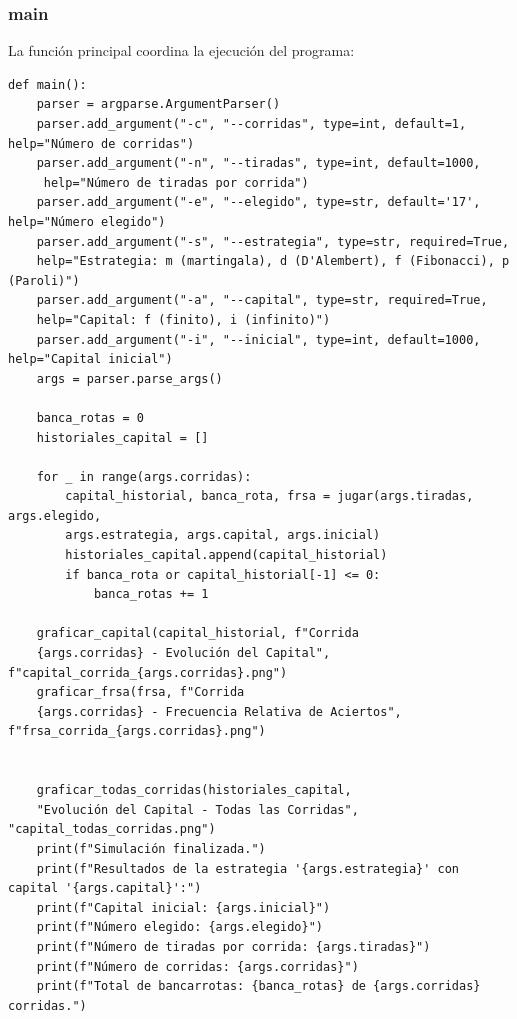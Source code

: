 \documentclass{article}
\begin{document}
\subsubsection{main}
La función principal coordina la ejecución del programa:

\begin{verbatim}
def main():
    parser = argparse.ArgumentParser()
    parser.add_argument("-c", "--corridas", type=int, default=1, help="Número de corridas")
    parser.add_argument("-n", "--tiradas", type=int, default=1000,
     help="Número de tiradas por corrida")
    parser.add_argument("-e", "--elegido", type=str, default='17', help="Número elegido")
    parser.add_argument("-s", "--estrategia", type=str, required=True, 
    help="Estrategia: m (martingala), d (D'Alembert), f (Fibonacci), p (Paroli)")
    parser.add_argument("-a", "--capital", type=str, required=True, 
    help="Capital: f (finito), i (infinito)")
    parser.add_argument("-i", "--inicial", type=int, default=1000, help="Capital inicial")
    args = parser.parse_args()

    banca_rotas = 0
    historiales_capital = []

    for _ in range(args.corridas):
        capital_historial, banca_rota, frsa = jugar(args.tiradas, args.elegido, 
        args.estrategia, args.capital, args.inicial)
        historiales_capital.append(capital_historial)
        if banca_rota or capital_historial[-1] <= 0:
            banca_rotas += 1

    graficar_capital(capital_historial, f"Corrida 
    {args.corridas} - Evolución del Capital", f"capital_corrida_{args.corridas}.png")
    graficar_frsa(frsa, f"Corrida 
    {args.corridas} - Frecuencia Relativa de Aciertos", f"frsa_corrida_{args.corridas}.png")
        
    
    graficar_todas_corridas(historiales_capital, 
    "Evolución del Capital - Todas las Corridas", "capital_todas_corridas.png")
    print(f"Simulación finalizada.")
    print(f"Resultados de la estrategia '{args.estrategia}' con capital '{args.capital}':")
    print(f"Capital inicial: {args.inicial}")
    print(f"Número elegido: {args.elegido}")
    print(f"Número de tiradas por corrida: {args.tiradas}")
    print(f"Número de corridas: {args.corridas}")
    print(f"Total de bancarrotas: {banca_rotas} de {args.corridas} corridas.")

\end{verbatim}
\end{document}
